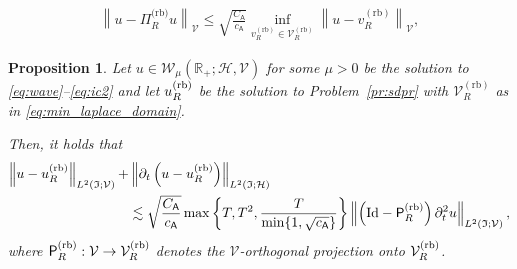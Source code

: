 \documentclass[10pt,a4paper]{amsart}
\newtheorem{proposition}{Proposition}
\newcommand{\MS}[1]{{\color{red} #1}}
\newcommand{\cV}{\mathcal{V}}
\newcommand{\cVrb}{\cV^\rb_R}
\newcommand{\norm}[1]{\left \lVert #1 \right \rVert}
\newcommand{\rb}{{(\mathrm{rb})}}
\newcommand{\vrb}{v^\rb_R}
\begin{document}
\begin{align}\label{eq:cea_elliptic_projection}
    \norm{u - \Pi^{\text{(rb)}}_R u}_\cV 
    \leq 
    \sqrt{\frac{C_\mathsf{A}}{c_\mathsf{A}}}
    \inf_{\vrb\in\cVrb}\norm{u-\vrb}_\cV,
\end{align}

\begin{proposition}\label{eq:best_approximation}
Let $u \in \mathcal{W}_\mu(\mathbb{R}_+;\mathcal{H},\mathcal{V})$ for some $\mu>0$ be the solution to \eqref{eq:wave}--\eqref{eq:ic2} 
and let $u^{\normalfont\text{(rb)}}_R$ be the solution to Problem~\ref{pr:sdpr}
with $\cVrb$ as in \eqref{eq:min_laplace_domain}.

Then, it holds that
\begin{equation}
\begin{aligned}
	\norm{
		u
		-
		u^{\normalfont\text{(rb)}}_R
	}_{L^2(\mathfrak{I};\mathcal{V})}
    +
    &
	\norm{
		\partial_t 
		\left(
			u
			-
			u^{\normalfont\text{(rb)}}_R
		\right)
	}_{L^2(\mathfrak{I};\mathcal{H})}
	\\
	&
    \lesssim
    \sqrt{\frac{C_\mathsf{A}}{c_\mathsf{A}}}
   \max\left\{T,T^2, \frac{T}{\min\{1,\sqrt{ c_{\mathsf{A}} }\}}\right\}
    \norm{
        \left(
            \normalfont\text{Id}
            -
            \mathsf{P}^{\normalfont\text{(rb)}}_R
        \right) \partial^2_t u
    }_{L^2(\mathfrak{I};\mathcal{V})},
\end{aligned}
\end{equation}
where $\mathsf{P}^{\normalfont\text{(rb)}}_R: \mathcal{V} 
\rightarrow \mathcal{V}^{\normalfont\text{(rb)}}_R$ denotes
the $\mathcal{V}$-orthogonal projection onto $\mathcal{V}^{\normalfont\text{(rb)}}_R$.
\end{proposition}
\end{document}
